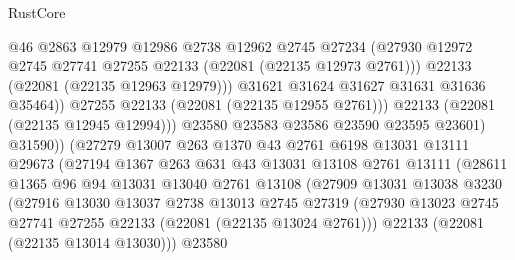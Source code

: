 \begin{lexlean}{RustCore}
\begin{coremodule}
                                @46
                                @2863
                                @12979
                                @12986
                                @2738
                                @12962
                                @2745
                                @27234
                                (@27930
                                  @12972
                                  @2745
                                  @27741
                                  @27255
                                  @22133
                                  (@22081 (@22135 @12973 @2761)))
                                @22133
                                (@22081 (@22135 @12963 @12979)))
                              @31621
                              @31624
                              @31627
                              @31631
                              @31636
                              @35464))
                          @27255
                          @22133
                          (@22081 (@22135 @12955 @2761)))
                        @22133
                        (@22081 (@22135 @12945 @12994)))
                      @23580
                      @23583
                      @23586
                      @23590
                      @23595
                      @23601)
                    @31590))
                (@27279
                  @13007
                  @263
                  @1370
                  @43
                  @2761
                  @6198
                  @13031
                  @13111
                  @29673
                  (@27194
                    @1367
                    @263
                    @631
                    @43
                    @13031
                    @13108
                    @2761
                    @13111
                    (@28611
                      @1365
                      @96
                      @94
                      @13031
                      @13040
                      @2761
                      @13108
                      (@27909
                        @13031
                        @13038
                        @3230
                        (@27916
                          @13030
                          @13037
                          @2738
                          @13013
                          @2745
                          @27319
                          (@27930 @13023 @2745 @27741 @27255 @22133 (@22081 (@22135 @13024 @2761)))
                          @22133
                          (@22081 (@22135 @13014 @13030)))
                        @23580

\end{coremodule}
\end{lexlean}
